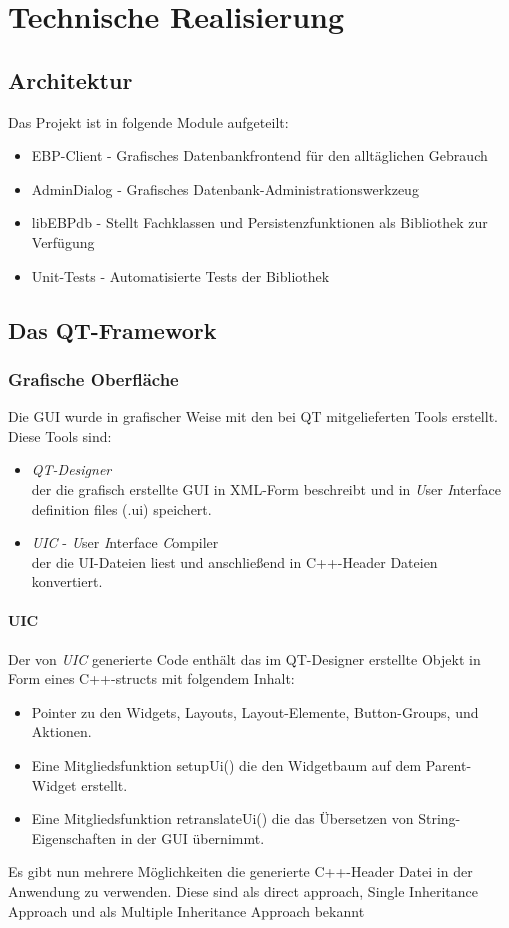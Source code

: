 \section{Technische Realisierung}

\subsection{Architektur}
Das Projekt ist in folgende Module aufgeteilt:
\begin{itemize}
	\item EBP-Client - Grafisches Datenbankfrontend für den alltäglichen Gebrauch
	\item AdminDialog - Grafisches Datenbank-Administrationswerkzeug
	\item libEBPdb - Stellt Fachklassen und Persistenzfunktionen als Bibliothek zur Verfügung
	\item Unit-Tests - Automatisierte Tests der Bibliothek
\end{itemize}

\newpage

\subsection{Das QT-Framework}
\subsubsection{Grafische Oberfläche}
Die GUI wurde in grafischer Weise mit den bei QT mitgelieferten Tools erstellt.
Diese Tools sind:
\begin{itemize}
	\item \textit{QT-Designer}\\ der die grafisch erstellte GUI in XML-Form beschreibt und in \textit{U}ser \textit{I}nterface definition files (.ui) speichert.
	\item \textit{UIC} - \textit{U}ser \textit{I}nterface \textit{C}ompiler\\ der die UI-Dateien liest und anschließend in C++-Header Dateien konvertiert.
\end{itemize}
\paragraph{UIC}
Der von \textit{UIC} generierte Code enthält das im QT-Designer erstellte Objekt in Form eines C++-structs mit folgendem Inhalt:
\begin{itemize}
	\item Pointer zu den Widgets, Layouts, Layout-Elemente, Button-Groups, und Aktionen.
	\item Eine Mitgliedsfunktion setupUi() die den Widgetbaum auf dem Parent-Widget erstellt.
	\item Eine Mitgliedsfunktion retranslateUi() die das Übersetzen von String-Eigenschaften in der GUI übernimmt.
\end{itemize}
Es gibt nun mehrere Möglichkeiten die generierte C++-Header Datei in der Anwendung zu verwenden.
Diese sind als direct approach, Single Inheritance Approach und als Multiple Inheritance Approach bekannt
